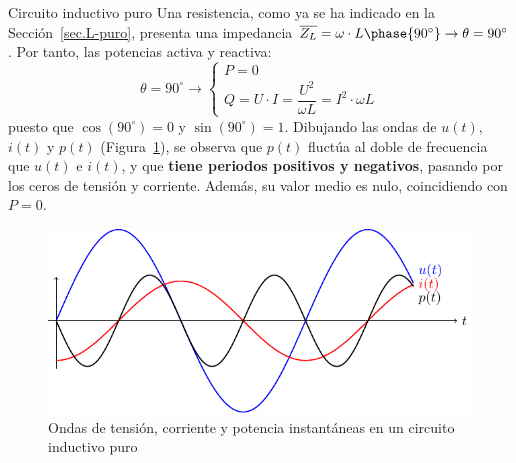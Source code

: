 \documentclass[11pt]{book} %
\makeatletter
\numberwithin{dummy}{section}
\theoremstyle{ocrenumbox}
\theoremstyle{blacknumex}
\theoremstyle{blacknumbox}
\theoremstyle{ocrenum}
\renewcommand{\subsection}{\@startsection {subsection}{2}{\z@}
{-3ex \@plus -0.1ex \@minus -.4ex}
{0.5ex \@plus.2ex }
{\normalfont\sffamily\bfseries}}
\makeatother
\begin{document}
	\subsection{Circuito inductivo puro}\label{sec.potencia_L}
	Una resistencia, como ya se ha indicado en la Sección~\ref{sec.L-puro}, presenta una impedancia $\overline{Z_L}=\omega\cdot L\phase{90^\circ}\rightarrow \theta=90^\circ$. Por tanto, las potencias activa y reactiva: 
	\begin{equation}
		\theta = 90^\circ \rightarrow
		\boxed{\begin{cases}
				P = 0\\
				Q = U\cdot I = \dfrac{U^2}{\omega L} = I^2\cdot  \omega L
		\end{cases}}
	\end{equation}
	puesto que $\cos(90^\circ)=0$ y $\sin(90^\circ)=1$. Dibujando las ondas de $u(t)$, $i(t)$ y $p(t)$ (Figura~\ref{fig.inductivoPotencia}), se observa que $p(t)$ fluctúa al doble de frecuencia que $u(t)$ e $i(t)$, y que \textbf{tiene periodos positivos y negativos}, pasando por los ceros de tensión y corriente. Además, su valor medio es nulo, coincidiendo con $P=0$.
	\begin{figure}[htbp]
		\centering
		\includegraphics{../figs/inductivoPuroPotencia.pdf}
		\caption{Ondas de tensión, corriente y potencia instantáneas en un circuito inductivo puro}
		\label{fig.inductivoPotencia}
	\end{figure}
	
\end{document}
